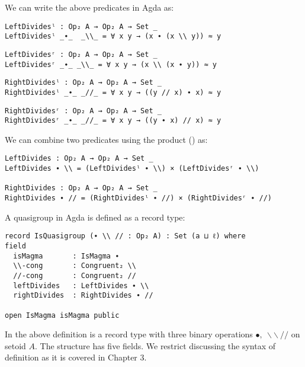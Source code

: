 We can write the above predicates in Agda as:

\begin{verbatim}
LeftDividesˡ : Op₂ A → Op₂ A → Set _
LeftDividesˡ _∙_  _\\_ = ∀ x y → (x ∙ (x \\ y)) ≈ y
\end{verbatim}
\begin{verbatim}
LeftDividesʳ : Op₂ A → Op₂ A → Set _
LeftDividesʳ _∙_ _\\_ = ∀ x y → (x \\ (x ∙ y)) ≈ y
\end{verbatim}
\begin{verbatim}
RightDividesˡ : Op₂ A → Op₂ A → Set _
RightDividesˡ _∙_ _//_ = ∀ x y → ((y // x) ∙ x) ≈ y
\end{verbatim}
\begin{verbatim}
RightDividesʳ : Op₂ A → Op₂ A → Set _
RightDividesʳ _∙_ _//_ = ∀ x y → ((y ∙ x) // x) ≈ y
\end{verbatim}

We can combine two predicates using the product () as:

\begin{verbatim}
LeftDivides : Op₂ A → Op₂ A → Set _
LeftDivides ∙ \\ = (LeftDividesˡ ∙ \\) × (LeftDividesʳ ∙ \\)

RightDivides : Op₂ A → Op₂ A → Set _
RightDivides ∙ // = (RightDividesˡ ∙ //) × (RightDividesʳ ∙ //)
\end{verbatim} 

A quasigroup in Agda is defined as a record type:

\begin{verbatim}
record IsQuasigroup (∙ \\ // : Op₂ A) : Set (a ⊔ ℓ) where
field
  isMagma       : IsMagma ∙
  \\-cong       : Congruent₂ \\
  //-cong       : Congruent₂ //
  leftDivides   : LeftDivides ∙ \\
  rightDivides  : RightDivides ∙ //

open IsMagma isMagma public
\end{verbatim}
In the above definition  is a record type with three binary
operations $∙,\ \backslash\backslash \ //$ on setoid $A$. The structure has five
fields. We restrict discussing the syntax of definition as it is covered in
Chapter 3.

